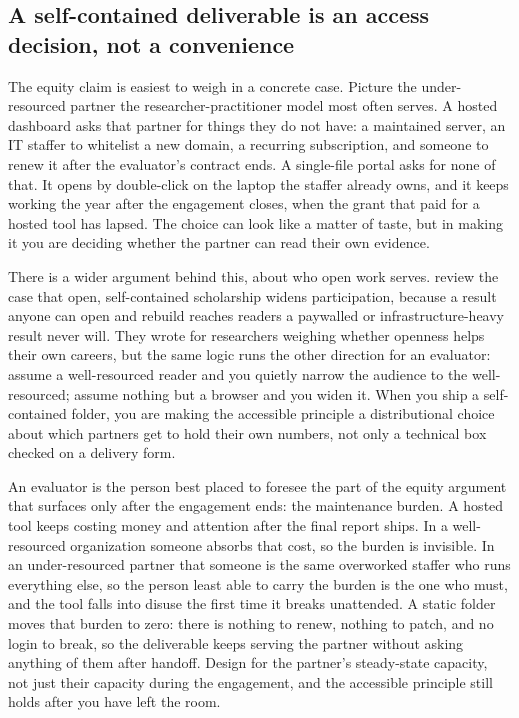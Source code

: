 \subsection{A self-contained deliverable is an access decision, not a convenience}
The equity claim is easiest to weigh in a concrete case. Picture the under-resourced partner the researcher-practitioner model most often serves. A hosted dashboard asks that partner for things they do not have: a maintained server, an IT staffer to whitelist a new domain, a recurring subscription, and someone to renew it after the evaluator's contract ends. A single-file portal asks for none of that. It opens by double-click on the laptop the staffer already owns, and it keeps working the year after the engagement closes, when the grant that paid for a hosted tool has lapsed. The choice can look like a matter of taste, but in making it you are deciding whether the partner can read their own evidence.

There is a wider argument behind this, about who open work serves. \textcite{mckiernan2016open} review the case that open, self-contained scholarship widens participation, because a result anyone can open and rebuild reaches readers a paywalled or infrastructure-heavy result never will. They wrote for researchers weighing whether openness helps their own careers, but the same logic runs the other direction for an evaluator: assume a well-resourced reader and you quietly narrow the audience to the well-resourced; assume nothing but a browser and you widen it. When you ship a self-contained folder, you are making the accessible principle a distributional choice about which partners get to hold their own numbers, not only a technical box checked on a delivery form.

An evaluator is the person best placed to foresee the part of the equity argument that surfaces only after the engagement ends: the maintenance burden. A hosted tool keeps costing money and attention after the final report ships. In a well-resourced organization someone absorbs that cost, so the burden is invisible. In an under-resourced partner that someone is the same overworked staffer who runs everything else, so the person least able to carry the burden is the one who must, and the tool falls into disuse the first time it breaks unattended. A static folder moves that burden to zero: there is nothing to renew, nothing to patch, and no login to break, so the deliverable keeps serving the partner without asking anything of them after handoff. Design for the partner's steady-state capacity, not just their capacity during the engagement, and the accessible principle still holds after you have left the room.

